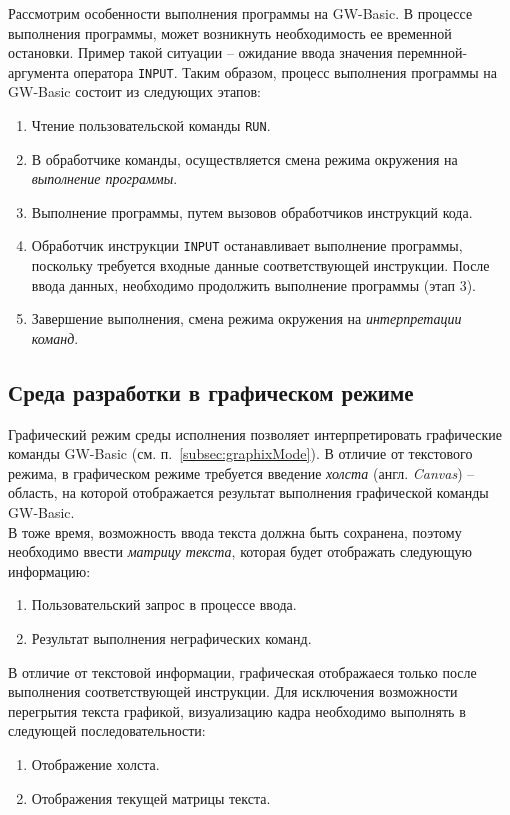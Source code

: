\documentclass[12pt]{article}
\begin{document}
			\indent Рассмотрим особенности выполнения программы на GW-Basic. В процессе выполнения программы, может возникнуть необходимость ее временной остановки. Пример такой ситуации -- ожидание ввода значения перемнной-аргумента оператора {\tt INPUT}. Таким образом, процесс выполнения программы на GW-Basic состоит из следующих этапов:
			\begin{enumerate}
				\item Чтение пользовательской команды {\tt RUN}.
				\item В обработчике команды, осуществляется смена режима окружения на {\it выполнение программы}.
				\item Выполнение программы, путем вызовов обработчиков инструкций кода.
				\item Обработчик инструкции {\tt INPUT} останавливает выполнение программы, поскольку требуется входные данные соответствующей инструкции. После ввода данных, необходимо продолжить выполнение программы (этап 3).
				\item Завершение выполнения, смена режима окружения на {\it интерпретации команд}.
			\end{enumerate}
			\subsection{Среда разработки в графическом режиме}
			\label{subsec:ideArch}
			\hspace{\parindent} Графический режим среды исполнения позволяет интерпретировать графические команды GW-Basic (см. п.~\ref{subsec:graphixMode}). В отличие от текстового режима, в графическом режиме требуется введение {\it холста} (англ. {\it Canvas}) -- область, на которой отображается результат выполнения графической команды GW-Basic. \\ 
			\indent В тоже время, возможность ввода текста должна быть сохранена, поэтому необходимо ввести {\it матрицу текста}, которая будет отображать следующую информацию:
			\begin{enumerate}
				\item Пользовательский запрос в процессе ввода.
				\item Результат выполнения неграфических команд.
			\end{enumerate}

			\indent В отличие от текстовой информации, графическая отображаеся только после выполнения соответствующей инструкции. Для исключения возможности перегрытия текста графикой, визуализацию кадра необходимо выполнять в следующей последовательности:
			\begin{enumerate}
				\item Отображение холста.
				\item Отображения текущей матрицы текста.
			\end{enumerate}
			
\end{document}
